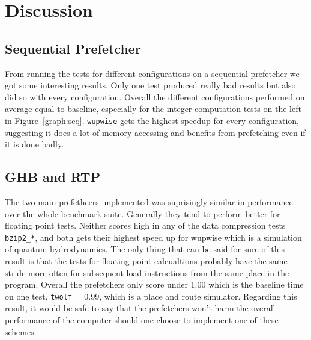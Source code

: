 \section{Discussion} %


\subsection{Sequential Prefetcher}

From running the tests for different configurations on a sequential
prefetcher we got some interesting results. Only one test produced
really bad results but also did so with every configuration. Overall
the different configurations performed on average equal to baseline,
especially for the integer computation tests on the left in
Figure~\ref{graph:seq}. \texttt{wupwise} gets the highest speedup for
every configuration, suggesting it does a lot of memory accessing and
benefits from prefetching even if it is done badly. 

\subsection{GHB and RTP}
The two main prefethcers implemented was suprisingly similar in
performance over the whole benchmark suite. Generally they tend to
perform better for floating point tests. Neither scores high in any of
the data compression tests \texttt{bzip2\_*}, and both gets their
highest speed up for wupwise which is a simulation of quantum
hydrodynamics. The only thing that can be said for sure of this result
is that the tests for floating point calcualtions probably have the
same stride more often for subsequent load instructions from the same
place in the program. Overall the prefetchers only score under 1.00
which is the baseline time on one test,  \texttt{twolf} = 0.99, which is a
place and route simulator. Regarding this result, it would be safe to
say that the prefetchers won't harm the overall performance of the
computer should one choose to implement one of these schemes. 
